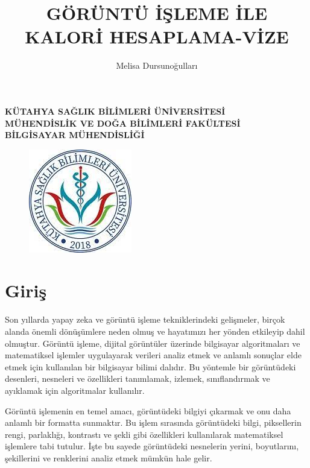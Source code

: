 \documentclass[11pt,a4paper]{report}
\title{GÖRÜNTÜ İŞLEME İLE KALORİ HESAPLAMA-VİZE}
\author{Melisa Dursunoğulları}
\begin{document}
	\textbf{KÜTAHYA SAĞLIK BİLİMLERİ ÜNİVERSİTESİ}\\ \centering
	\textbf{MÜHENDİSLİK VE DOĞA BİLİMLERİ FAKÜLTESİ}\\ \centering
	\textbf{BİLGİSAYAR MÜHENDİSLİĞİ}\\ \centering
	\begin{figure}[!h]
		\centering
		\includegraphics{ksbu}
		\maketitle
	\end{figure}
	\newpage
	
	
	\raggedright
	\section{Giriş}
	Son yıllarda yapay zeka ve görüntü işleme tekniklerindeki gelişmeler, birçok alanda önemli dönüşümlere neden olmuş ve hayatımızı her yönden etkileyip dahil olmuştur. Görüntü işleme, dijital görüntüler üzerinde bilgisayar algoritmaları ve matematiksel işlemler uygulayarak verileri analiz etmek ve anlamlı sonuçlar elde etmek için kullanılan bir bilgisayar bilimi dalıdır. Bu yöntemle bir görüntüdeki desenleri, nesneleri ve özellikleri tanımlamak, izlemek, sınıflandırmak ve ayıklamak için algoritmalar kullanılır.

    Görüntü işlemenin en temel amacı, görüntüdeki bilgiyi çıkarmak ve onu daha anlamlı bir formatta sunmaktır. Bu işlem sırasında görüntüdeki bilgi, piksellerin rengi, parlaklığı, kontrastı ve şekli gibi özellikleri kullanılarak matematiksel işlemlere tabi tutulur. İşte bu sayede görüntüdeki nesnelerin yerini, boyutlarını, şekillerini ve renklerini analiz etmek mümkün hale gelir\cite{SOCARTürkiye}.
    \newline
\end{document}
